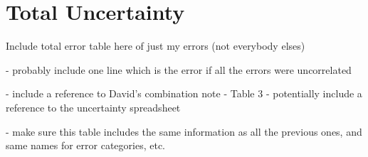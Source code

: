 
\section{Total Uncertainty}



Include total error table here of just my errors (not everybody elses)

- probably include one line which is the error if all the errors were uncorrelated

- include a reference to David's combination note \cite{CombinationNote} - Table 3 
- potentially include a reference to the uncertainty spreadsheet \cite{UncertaintySpreadsheet}


- make sure this table includes the same information as all the previous ones, and same names for error categories, etc.

